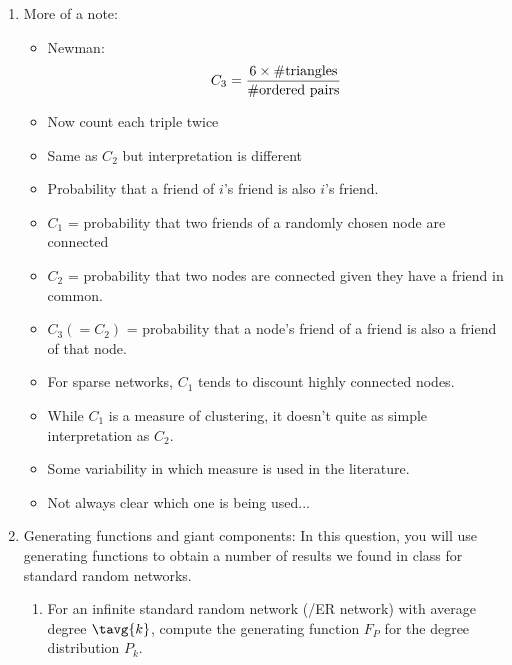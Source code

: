 \begin{enumerate}
\item

  More of a note:

  \begin{itemize}
  \item
    Newman\cite{newman2003a}: 
    $$ C_{3} = \frac{6 \times \rm\#triangles}{\mbox{\#ordered pairs}} $$ 
  \item
    Now count each triple twice
  \item
    Same as $C_{2}$ but interpretation is different
  \item
    Probability that a friend of $i$'s friend is also $i$'s friend.
  \end{itemize}

  \begin{itemize}
  \item $C_{1}$ = probability that two friends
    of a randomly chosen node are connected
  \item $C_{2}$ = probability that two nodes are
    connected given they have a friend in common.
  \item $C_{3} (=C_{2})$ = probability that a node's friend of a friend
    is also a friend of that node.
  \end{itemize}

  \begin{itemize}
  \item For sparse networks, $C_{1}$ tends to discount
    highly connected nodes.
  \item While $C_{1}$ is a measure of clustering, it
    doesn't quite as simple interpretation as $C_{2}$.
  \item Some variability in which measure is
    used in the literature.
  \item Not always clear which one is being used...
  \end{itemize}








  \item Generating functions and giant components:  In 
    this question, you will use generating functions to obtain
    a number of results we found in class for standard
    random networks.

    \begin{enumerate}
    \item 
      For an infinite standard random network 
      (\erdosrenyi/ER network)
      with average degree $\tavg{k}$,
      compute the generating function $F_{P}$ for the degree distribution $P_{k}$.


\end{enumerate}
\end{enumerate}
